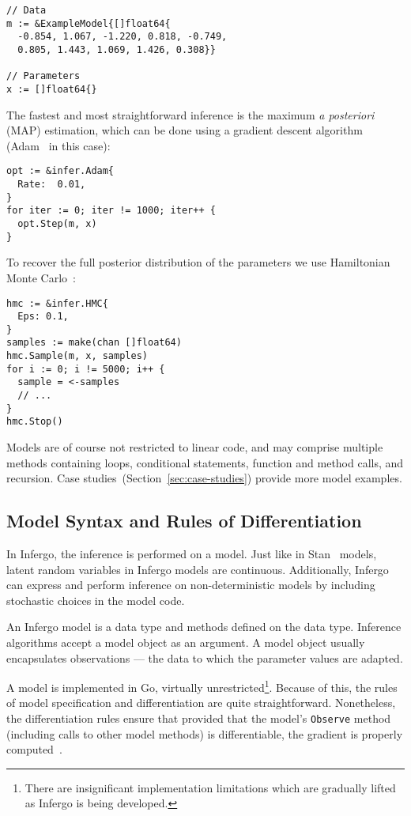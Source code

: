 \documentclass[sigplan,screen]{acmart}
\begin{document}
\begin{sloppypar}
\begin{lstlisting}
// Data
m := &ExampleModel{[]float64{
  -0.854, 1.067, -1.220, 0.818, -0.749,
  0.805, 1.443, 1.069, 1.426, 0.308}}

// Parameters
x := []float64{}
\end{lstlisting}

The fastest and most straightforward inference is the maximum
\textit{a posteriori} (MAP) estimation, which can be done using
a gradient descent algorithm (Adam~\cite{KB15} in this case):

\begin{lstlisting}
opt := &infer.Adam{
  Rate:  0.01,
}
for iter := 0; iter != 1000; iter++ {
  opt.Step(m, x)
}
\end{lstlisting}

To recover the full posterior distribution of
the parameters we use Hamiltonian Monte Carlo~\cite{N12}:

\begin{lstlisting}
hmc := &infer.HMC{
  Eps: 0.1,
}
samples := make(chan []float64)
hmc.Sample(m, x, samples)
for i := 0; i != 5000; i++ {
  sample = <-samples
  // ...
}
hmc.Stop()
\end{lstlisting}

Models are of course not restricted to linear code, and may
comprise multiple methods containing loops, conditional
statements, function and method calls, and recursion. Case
studies~(Section~\ref{sec:case-studies}) provide more
model examples.

\subsection{Model Syntax and Rules of Differentiation}

In Infergo, the inference is performed on a model. Just like in
Stan~\cite{Stan17} models, latent random variables in Infergo
models are continuous. Additionally, Infergo can express and
perform inference on non-deterministic models by including
stochastic choices in the model code.

An Infergo model is a data type and methods defined on the data
type.  Inference algorithms accept a model object as an
argument.  A model object usually encapsulates observations ---
the data to which the parameter values are adapted.

A model is implemented in Go, virtually
unrestricted\footnote{There are insignificant implementation
limitations which are gradually lifted as Infergo is being
developed.}. Because of this, the rules of model specification
and differentiation are quite straightforward. Nonetheless, the
differentiation rules ensure that provided that the model's
\lstinline{Observe} method (including calls to other model methods)
is differentiable, the gradient is properly computed~\cite{GW08}.


\end{sloppypar}
\end{document}
